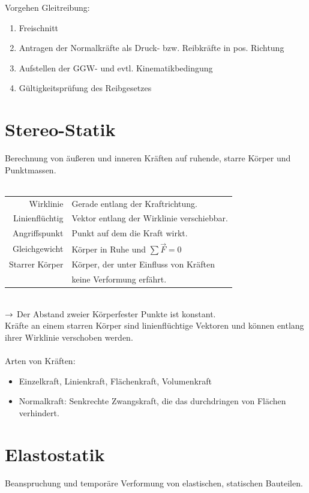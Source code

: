 \documentclass[fs, footer]{latex4ei}
\begin{document}
\begin{multicols}{4}
	Vorgehen Gleitreibung:
	\begin{enumerate}
		\item Freischnitt
		\item Antragen der Normalkräfte als Druck- bzw. Reibkräfte in pos. Richtung
		\item Aufstellen der GGW- und evtl. Kinematikbedingung
		\item Gültigkeitsprüfung des Reibgesetzes
	\end{enumerate}


\section{Stereo-Statik}
Berechnung von äußeren und inneren Kräften auf ruhende, starre Körper und Punktmassen.\\
\\
\begin{tabular}{rl}
Wirklinie & Gerade entlang der Kraftrichtung.\\
Linienflüchtig & Vektor entlang der Wirklinie verschiebbar.\\
Angriffspunkt &  Punkt auf dem die Kraft wirkt. \\
Gleichgewicht & Körper in Ruhe und $\sum \vec F = 0$\\
Starrer Körper & Körper, der unter Einfluss von Kräften \\ &  keine Verformung erfährt. 
\end{tabular} \\ 

$\rightarrow$ Der Abstand zweier Körperfester Punkte ist konstant.\\
Kräfte an einem starren Körper sind linienflüchtige Vektoren und können entlang ihrer Wirklinie verschoben werden. \\ \\
Arten von Kräften:
\begin{itemize}
\item Einzelkraft, Linienkraft, Flächenkraft, Volumenkraft \\
\item Normalkraft: Senkrechte Zwangskraft, die das durchdringen von Flächen verhindert.
\end{itemize}


\section{Elastostatik}
Beanspruchung und temporäre Verformung von elastischen, statischen Bauteilen.



\end{multicols}
\end{document}
